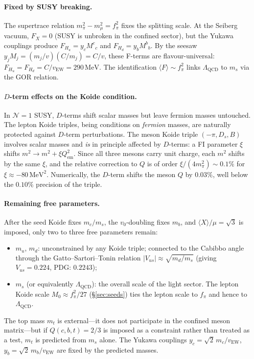 \documentclass[12pt,a4paper]{article}
\newcommand{\MeV}{\,\text{MeV}}
\newcommand{\fpi}{f_\pi}
\begin{document}
\paragraph{Fixed by SUSY breaking.}
The supertrace relation $m^2_\pi - m^2_\mu = \fpi^2$ fixes the
splitting scale. At the Seiberg vacuum, $F_X = 0$ (SUSY is
unbroken in the confined sector), but the Yukawa couplings
produce $F_{H_u} = y_c M^c{}_c$ and $F_{H_d} = y_b M^b{}_b$.
By the seesaw $y_j M_j = (m_j/v)(C/m_j) = C/v$, these
F-terms are flavour-universal:
$F_{H_u} = F_{H_d} = C/v_{\text{EW}} = 290\MeV$.
The identification $\langle F\rangle \sim \fpi^2$
links $\Lambda_{\text{QCD}}$ to $m_s$ via the GOR relation.

\paragraph{$D$-term effects on the Koide condition.}
In $\mathcal{N}=1$ SUSY, $D$-terms shift scalar masses but leave
fermion masses untouched. The lepton Koide triples, being conditions
on \emph{fermion} masses, are naturally protected against
$D$-term perturbations. The meson Koide triple
$(-\pi, D_s, B)$ involves scalar masses and \emph{is} in principle
affected by $D$-terms: a FI parameter $\xi$ shifts $m^2 \to m^2 + \xi Q_{\text{em}}^2$.
Since all three mesons carry unit charge, each $m^2$ shifts by the
same $\xi$, and the relative correction to $Q$ is of order
$\xi/(4m_\pi^2) \sim 0.1\%$ for $\xi \approx -80\MeV^2$.
Numerically, the $D$-term shifts the meson $Q$ by $0.03\%$,
well below the $0.10\%$ precision of the triple.

\paragraph{Remaining free parameters.}
After the seed Koide fixes $m_c/m_s$, the $v_0$-doubling fixes
$m_b$, and $\langle X\rangle/\mu = \sqrt{3}$ is imposed, only two to three free
parameters remain:
\begin{itemize}
  \item $m_u$, $m_d$: unconstrained by any Koide triple; connected
    to the Cabibbo angle through the Gatto--Sartori--Tonin relation
    $|V_{us}| \approx \sqrt{m_d/m_s}$ (giving $V_{us} = 0.224$,
    PDG: $0.2243$);
  \item $m_s$ (or equivalently $\Lambda_{\text{QCD}}$): the overall
    scale of the light sector. The lepton Koide scale
    $M_0 \approx \fpi^2/27$ (\S\ref{sec:seeds}) ties the lepton
    scale to $\fpi$ and hence to $\Lambda_{\text{QCD}}$.
\end{itemize}
The top mass $m_t$ is external---it does not participate in the
confined meson matrix---but if $Q(c,b,t) = 2/3$ is imposed as a
constraint rather than treated as a test, $m_t$ is predicted from
$m_s$ alone. The Yukawa couplings
$y_c = \sqrt{2}\,m_c/v_{\text{EW}}$,
$y_b = \sqrt{2}\,m_b/v_{\text{EW}}$ are fixed by the predicted masses.
\end{document}
